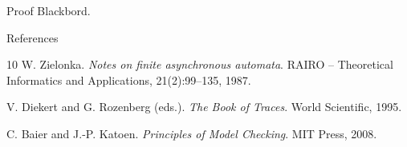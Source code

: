 \documentclass[t,11pt]{beamer}
\begin{document}
\begin{frame}{Proof}
Blackbord. 
\end{frame}



\begin{frame}{References}
  \begin{thebibliography}{10}
    W. Zielonka.
    \newblock \emph{Notes on finite asynchronous automata}.
    \newblock RAIRO -- Theoretical Informatics and Applications, 21(2):99--135, 1987.

    V. Diekert and G. Rozenberg (eds.).
    \newblock \emph{The Book of Traces}.
    \newblock World Scientific, 1995.

    C. Baier and J.-P. Katoen.
    \newblock \emph{Principles of Model Checking}.
    \newblock MIT Press, 2008.
  \end{thebibliography}
\end{frame}
\end{document}
